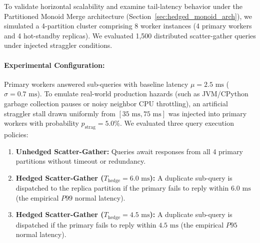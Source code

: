 To validate horizontal scalability and examine tail-latency behavior under the Partitioned Monoid Merge architecture (Section~\ref{sec:hedged_monoid_arch}), we simulated a 4-partition cluster comprising 8 worker instances (4 primary workers and 4 hot-standby replicas). We evaluated 1,500 distributed scatter-gather queries under injected straggler conditions.

\paragraph{Experimental Configuration:}
Primary workers answered sub-queries with baseline latency $\mu = 2.5\text{ ms}$ ($\sigma = 0.7\text{ ms}$). To emulate real-world production hazards (such as JVM/CPython garbage collection pauses or noisy neighbor CPU throttling), an artificial straggler stall drawn uniformly from $[35\text{ ms}, 75\text{ ms}]$ was injected into primary workers with probability $p_{\text{strag}} = 5.0\%$. We evaluated three query execution policies:
\begin{enumerate}
    \item \textbf{Unhedged Scatter-Gather:} Queries await responses from all 4 primary partitions without timeout or redundancy.
    \item \textbf{Hedged Scatter-Gather ($T_{\text{hedge}} = 6.0\text{ ms}$):} A duplicate sub-query is dispatched to the replica partition if the primary fails to reply within $6.0\text{ ms}$ (the empirical $P99$ normal latency).
    \item \textbf{Hedged Scatter-Gather ($T_{\text{hedge}} = 4.5\text{ ms}$):} A duplicate sub-query is dispatched if the primary fails to reply within $4.5\text{ ms}$ (the empirical $P95$ normal latency).
\end{enumerate}

\begin{table}[htbp]
\centering
{}
\caption{Distributed scatter-gather tail latency percentiles across 1,500 queries over 4 partitions with 5\% worker straggler probability.}
\label{tab:hedged_benchmark}
\end{table}

